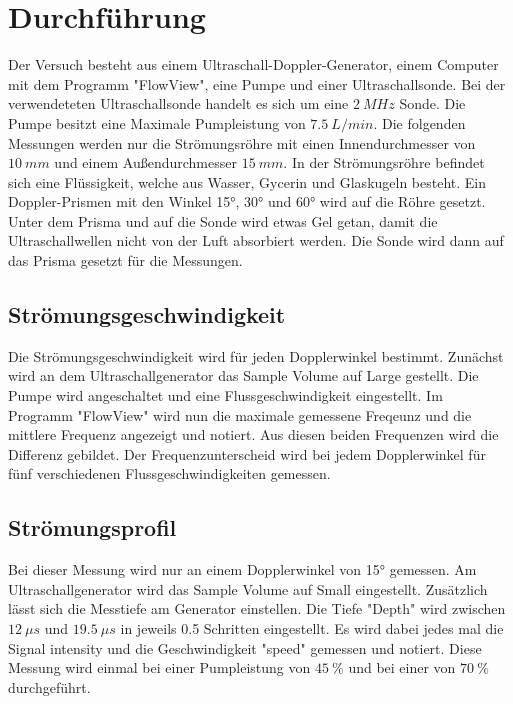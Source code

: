 \section{Durchführung}
\label{sec:Durchführung}
Der Versuch besteht aus einem Ultraschall-Doppler-Generator, einem Computer mit dem Programm "FlowView", eine Pumpe und einer Ultraschallsonde. 
Bei der verwendeteten Ultraschallsonde handelt es sich um eine $\qty{2}{MHz}$ Sonde.
Die Pumpe besitzt eine Maximale Pumpleistung von $\qty{7.5}{L/min}$.
Die folgenden Messungen werden nur die Strömungsröhre mit einen Innendurchmesser von $\qty{10}{mm}$ und einem Außendurchmesser $\qty{15}{mm}$.
In der Strömungsröhre befindet sich eine Flüssigkeit, welche aus Wasser, Gycerin und Glaskugeln besteht.
Ein Doppler-Prismen mit den Winkel 15°, 30° und 60° wird auf die Röhre gesetzt.
Unter dem Prisma und auf die Sonde wird etwas Gel getan, damit die Ultraschallwellen nicht von der Luft absorbiert werden.
Die Sonde wird dann auf das Prisma gesetzt für die Messungen.

\subsection{Strömungsgeschwindigkeit}
Die Strömungsgeschwindigkeit wird für jeden Dopplerwinkel bestimmt.
Zunächst wird an dem Ultraschallgenerator das Sample Volume auf Large gestellt.
Die Pumpe wird angeschaltet und eine Flussgeschwindigkeit eingestellt.
Im Programm "FlowView" wird nun die maximale gemessene Freqeunz und die mittlere Frequenz angezeigt und notiert.
Aus diesen beiden Frequenzen wird die Differenz gebildet.
Der Frequenzunterscheid wird bei jedem Dopplerwinkel für fünf verschiedenen Flussgeschwindigkeiten gemessen.

\subsection{Strömungsprofil}
Bei dieser Messung wird nur an einem Dopplerwinkel von 15° gemessen.
Am Ultraschallgenerator wird das Sample Volume auf Small eingestellt.
Zusätzlich lässt sich die Messtiefe am Generator einstellen.
Die Tiefe "Depth" wird zwischen $\qty{12}{\mu s}$ und $\qty{19.5}{\mu s}$ in jeweils 0.5 Schritten eingestellt.
Es wird dabei jedes mal die Signal intensity und die Geschwindigkeit "speed" gemessen und notiert.
Diese Messung wird einmal bei einer Pumpleistung von $\qty{45}{\%}$ und bei einer von $\qty{70}{\%}$ durchgeführt.